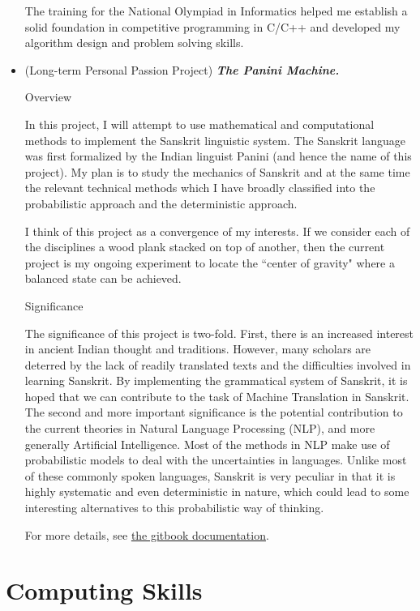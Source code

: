 \documentclass[11pt,reqno,oneside,a4paper]{article}
\begin{document}
\begin{itemize}
		 \par The training for the National Olympiad in Informatics helped me establish a solid foundation in competitive programming in C/C++ and developed my algorithm design and problem solving skills. 
		 
		 \item (Long-term Personal Passion Project) \emph{\textbf{The Panini Machine.}}
		 
		 \par Overview 
		 
		 In this project, I will attempt to use mathematical and computational methods to implement the Sanskrit linguistic system. The Sanskrit language was first formalized by the Indian linguist Panini (and hence the name of this project). My plan is to study the mechanics of Sanskrit and at the same time the relevant technical methods which I have broadly classified into the probabilistic approach and the deterministic approach. 
		 
		 I think of this project as a convergence of my interests. If we consider each of the disciplines a wood plank stacked on top of another, then the current project is my ongoing experiment to locate the ``center of gravity" where a balanced state can be achieved. 
		 
		 Significance 
		 
		 The significance of this project is two-fold. First, there is an increased interest in ancient Indian thought and traditions. However, many scholars are deterred by the lack of readily translated texts and the difficulties involved in learning Sanskrit. By implementing the grammatical system of Sanskrit, it is hoped that we can contribute to the task of Machine Translation in Sanskrit. The second and more important significance is the potential contribution to the current theories in Natural Language Processing (NLP), and more generally Artificial Intelligence. Most of the methods in NLP make use of probabilistic models to deal with the uncertainties in languages. Unlike most of these commonly spoken languages, Sanskrit is very peculiar in that it is highly systematic and even deterministic in nature, which could lead to some interesting alternatives to this probabilistic way of thinking. 
		 
		 For more details, see \href{https://zhangliu.gitbook.io/the-panini-machine/}{the gitbook documentation}.
		 
	\end{itemize}

\section{Computing Skills}
\end{document}
